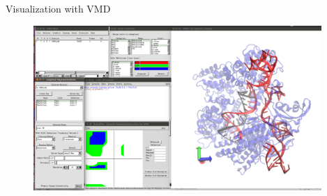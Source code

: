 \documentclass{beamer}
\begin{document}
\begin{frame}{Visualization with VMD}
  \begin{figure}
    \includegraphics[width=4.3in]{../../Lecture_Pictures/VMD}
  \end{figure}
\end{frame}
\end{document}
